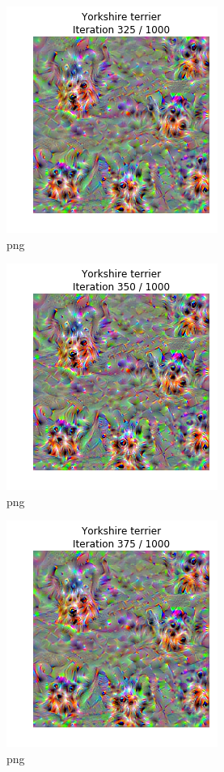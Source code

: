 \documentclass[]{book}
\theoremstyle{definition}
\theoremstyle{definition}
\theoremstyle{definition}
\theoremstyle{remark}
\begin{document}
\begin{figure}
\centering
\includegraphics{Network-Visualization-TensorFlow_files/Network-Visualization-TensorFlow_24_14.png}
\caption{png}
\end{figure}

\begin{figure}
\centering
\includegraphics{Network-Visualization-TensorFlow_files/Network-Visualization-TensorFlow_24_15.png}
\caption{png}
\end{figure}

\begin{figure}
\centering
\includegraphics{Network-Visualization-TensorFlow_files/Network-Visualization-TensorFlow_24_16.png}
\caption{png}
\end{figure}
\end{document}
